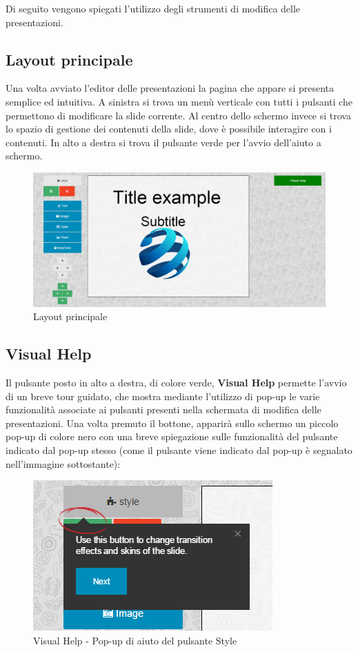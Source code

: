 Di seguito vengono spiegati l'utilizzo degli strumenti di modifica delle presentazioni.

\subsection{Layout principale}
Una volta avviato l'editor delle presentazioni la pagina che appare si presenta semplice ed intuitiva. A sinistra si trova un menù verticale con tutti i pulsanti che permettono di modificare la slide corrente. Al centro dello schermo invece si trova lo spazio di gestione dei contenuti della slide, dove è possibile interagire con i contenuti. In alto a destra si trova il pulsante verde per l'avvio dell'aiuto a schermo.

\begin{figure}[H] 
	\centering 
	\includegraphics[scale=0.40] {img/layout_editor.png}
	\caption{Layout principale} 
\end{figure}

\subsection{Visual Help}
Il pulsante posto in alto a destra, di colore verde, \textbf{Visual Help} permette l'avvio di un breve tour guidato, che mostra mediante l'utilizzo di pop-up le varie funzionalità associate ai pulsanti presenti nella schermata di modifica delle presentazioni. Una volta premuto il bottone, apparirà sullo schermo un piccolo pop-up di colore nero con una breve spiegazione sulle funzionalità del pulsante indicato dal pop-up stesso (come il pulsante viene indicato dal pop-up è segnalato nell'immagine sottostante):

\begin{figure}[H] 
	\centering 
	\includegraphics[scale=0.80] {img/tour.png}
	\caption{Visual Help - Pop-up di aiuto del pulsante Style} 
\end{figure}


